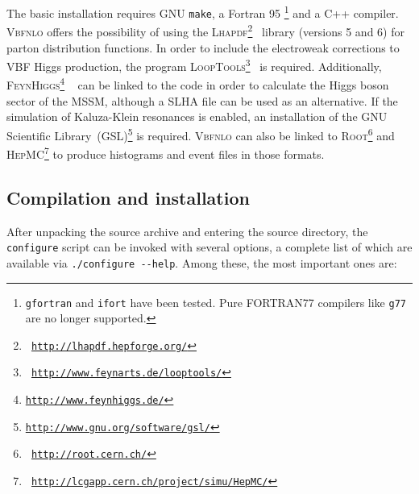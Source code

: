 \documentclass[english,12pt]{article}
\begin{document}
The basic installation requires GNU {\tt make}, a {\sc Fortran} 95 \footnote{{\tt gfortran}
and {\tt ifort} have been tested. Pure FORTRAN77 compilers like {\tt g77} are no longer supported.} and a C++ compiler.
\textsc{Vbfnlo} offers the possibility of using the \textsc{Lhapdf}\footnote{\tt
\href{http://lhapdf.hepforge.org/}{http://lhapdf.hepforge.org/}}~\cite{Whalley:2005nh} library (versions 5 and 6) for parton
distribution functions. In order to include the electroweak corrections to VBF
Higgs production, the program \textsc{LoopTools}\footnote{\tt
\href{http://www.feynarts.de/looptools/}{http://www.feynarts.de/looptools/}}~\cite{Hahn:1998yk,Hahn:2006qw} is required.
Additionally, \textsc{FeynHiggs}\footnote{\tt \href{http://www.feynhiggs.de/}{http://www.feynhiggs.de/}}
~\cite{Frank:2006yh,Degrassi:2002fi,Heinemeyer:1998np,Heinemeyer:1998yj} can be
linked to the code in order to calculate the Higgs boson sector of the MSSM,
although a SLHA file can be used as an alternative.  If the simulation of
Kaluza-Klein resonances is enabled, an installation of the GNU Scientific
Library~(GSL)\footnote{\tt \href{http://www.gnu.org/software/gsl/}{http://www.gnu.org/software/gsl/}} is required.
\textsc{Vbfnlo} can also be linked to \textsc{Root}\footnote{\tt
\href{http://root.cern.ch/}{http://root.cern.ch/}} and \textsc{HepMC}\footnote{\tt
\href{http://lcgapp.cern.ch/project/simu/HepMC/}{http://lcgapp.cern.ch/project/simu/HepMC/}} to produce histograms and event files
in those formats. 


\subsection{Compilation and installation}
\label{compilation}

After unpacking the source archive and entering the source directory, the {\tt
configure} script can be invoked with several options, a complete list of which are
available via {\tt ./configure~-{}-help}.  Among these, the most important ones
are:
\end{document}

